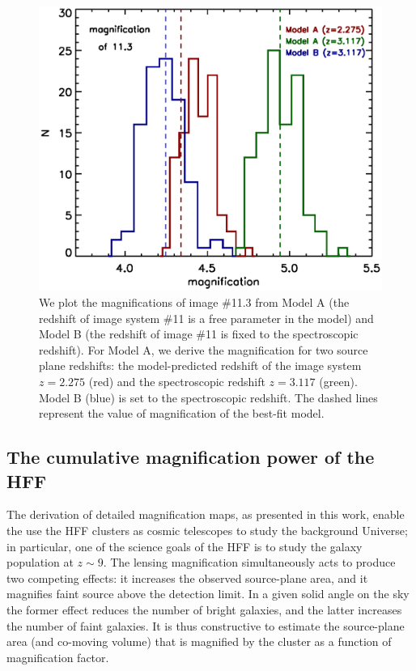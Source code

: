 \begin{figure}[h]
\includegraphics[width=\textwidth]{Chap2/c2f8.eps}
\caption[Magnifications of image \#11.3 in Abell S1063 for Model A and Model B]{We plot the magnifications of image \#11.3 from Model A (the redshift of image system \#11 is a free parameter in the model) and Model B (the redshift of image \#11 is fixed to the spectroscopic redshift). For Model A, we derive the magnification for two source plane redshifts: the model-predicted redshift of the image system $z=2.275$ (red) and the spectroscopic redshift $z=3.117$ (green). Model B (blue) is set to the spectroscopic redshift. The dashed lines represent the value of magnification of the best-fit model.}
\label{chap2:fig:mag11}
\end{figure}

\subsection{The cumulative magnification power of the HFF}
The derivation of detailed magnification maps, as presented in this work, enable the use the HFF clusters as cosmic telescopes to study the background Universe; in particular, one of the science goals of the HFF is to study the galaxy population at $z\sim9$.  The lensing magnification simultaneously acts to produce two competing effects: it increases the observed source-plane area, and it magnifies faint source above the detection limit. In a given solid angle on the sky the former effect reduces the number of bright galaxies, and the latter increases the number of faint galaxies. It is thus constructive to estimate the source-plane area (and co-moving volume) that is magnified by the cluster as a function of magnification factor. 

